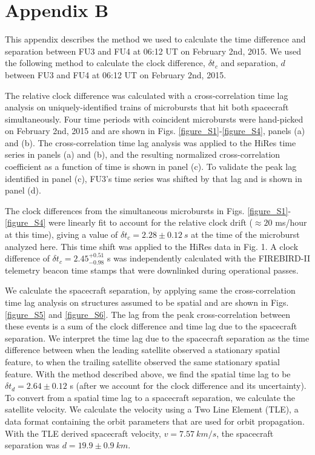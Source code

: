 
\chapter{Appendix B}\label{appendixb}
This appendix describes the method we used to calculate the time difference and separation between FU3 and FU4 at 06:12 UT on February 2nd, 2015. We used the following method to calculate the clock difference, $\delta t_{c}$  and separation, $d$ between FU3 and FU4 at 06:12 UT on February 2nd, 2015.

The relative clock difference was calculated with a cross-correlation time lag analysis on uniquely-identified trains of microbursts that hit both spacecraft simultaneously. Four time periods with coincident microbursts were hand-picked on February 2nd, 2015 and are shown in Figs. \ref{figure_S1}-\ref{figure_S4}, panels (a) and (b). The cross-correlation time lag analysis was applied to the HiRes time series in panels (a) and (b), and the resulting normalized cross-correlation coefficient as a function of time is shown in panel (c). To validate the peak lag identified in panel (c), FU3's time series was shifted by that lag and is shown in panel (d).

The clock differences from the simultaneous microbursts in Figs. \ref{figure_S1}-\ref{figure_S4} were linearly fit to account for the relative clock drift (${\approx} 20$ ms/hour at this time), giving a value of $\delta t_{c} = 2.28 \pm 0.12 \ s$ at the time of the microburst analyzed here. This time shift was applied to the HiRes data in Fig. 1. A clock difference of $\delta t_{c}  = 2.45^{+ 0.51}_{-0.98}$ s was independently calculated with the FIREBIRD-II telemetry beacon time stamps that were downlinked during operational passes.

We calculate the spacecraft separation, by applying same the cross-correlation time lag analysis on structures assumed to be spatial and are shown in Figs. \ref{figure_S5} and \ref{figure_S6}. The lag from the peak cross-correlation between these events is a sum of the clock difference and time lag due to the spacecraft separation. We interpret the time lag due to the spacecraft separation as the time difference between when the leading satellite observed a stationary spatial feature, to when the trailing satellite observed the same stationary spatial feature. With the method described above, we find the spatial time lag to be $\delta t_{d} = 2.64 \pm 0.12$ s (after we account for the clock difference and its uncertainty). To convert from a spatial time lag to a spacecraft separation, we calculate the satellite velocity. We calculate the velocity using a Two Line Element (TLE), a data format containing the orbit parameters that are used for orbit propagation. With the TLE derived spacecraft velocity, $v = 7.57 \ km/s$, the spacecraft separation was $d = 19.9 \pm 0.9 \ km $.

